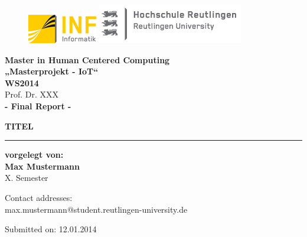 \begin{titlepage}

\begin{center}

\begin{figure}
\begin{minipage}[H]{4cm}
\centering
\includegraphics[width=0.8\linewidth]{Bilder/Deckblatt/UniversityLogo}
\end{minipage}
\hfill
\begin{minipage}[H]{6cm}
\centering
\includegraphics[width=1\linewidth]{Bilder/Deckblatt/CompanyLogo}
\end{minipage}
\end{figure}

\vspace*{0.8cm}

\textbf{Master in Human Centered Computing}\\
\textbf{„Masterprojekt - IoT“} \\
\vspace*{0.2cm}
{\large \textbf{WS2014\\}}
\vspace*{0.4cm}
Prof. Dr. XXX\\
\vspace*{0.8cm}
{\large \textbf{- Final Report -}}

\textbf{{\large {\Large TITEL }}}\\

\noindent\rule{\textwidth}{2pt}
\vspace*{0.6cm}

\textbf{vorgelegt von:\\}
{\large \textbf{Max Mustermann\\}}
X. Semester 

\vspace*{0.6cm}

Contact addresses:\\
max.mustermann@student.reutlingen-university.de\\

\vspace*{0.6cm}

Submitted on:	12.01.2014



\end{center}

\end{titlepage}